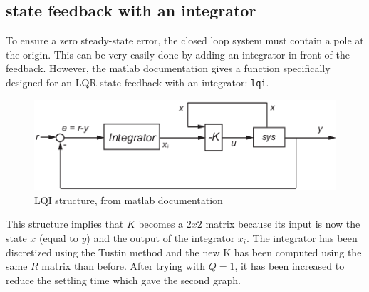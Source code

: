 \subsection{state feedback with an integrator}

To ensure a zero steady-state error, the closed loop system must contain a pole at the origin. This can be very easily 
done by adding an integrator in front of the feedback. However, the matlab documentation gives a function specifically
designed for an LQR state feedback with an integrator: \texttt{lqi}.

\begin{figure}[H]
    \centering
    \includegraphics[width = \textwidth]{Pictures/lqi_docs.png}
    \caption{LQI structure, from matlab documentation}
    \label{fig:lqi documentation}
\end{figure}

This structure implies that $K$ becomes a $2x2$ matrix because its input is now the state $x$ (equal to $y$) and the output of the integrator $x_i$. The integrator has been discretized using the Tustin method and the new K has been computed using the same $R$ matrix than before. After trying with $Q = 1$, it has been increased to reduce the settling time which gave the second graph.

